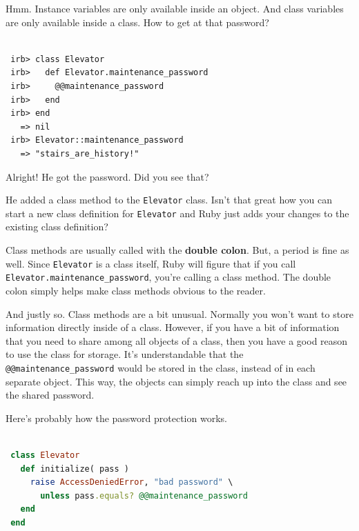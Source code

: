 \documentclass[10pt,twoside]{report}
\begin{document}
Hmm.  Instance variables are only available inside an object.  And
class variables are only available inside a class.  How to get at that
password?


\begin{lstlisting}

 irb> class Elevator
 irb>   def Elevator.maintenance_password
 irb>     @@maintenance_password
 irb>   end
 irb> end
   => nil
 irb> Elevator::maintenance_password
   => "stairs_are_history!"

\end{lstlisting}


Alright!  He got the password.  Did you see that?

He added a class method to the \lstinline[breaklines=true]|Elevator|
class.  Isn't that great how you can start a new class definition for
\lstinline[breaklines=true]|Elevator| and Ruby just adds your changes
to the existing class definition?

Class methods are usually called with the {\bf double colon}.  But, a
period is fine as well. Since \lstinline[breaklines=true]|Elevator| is
a class itself, Ruby will figure that if you call
\lstinline[breaklines=true]|Elevator.maintenance_password|, you're
calling a class method.  The double colon simply helps make class
methods obvious to the reader.

And justly so.  Class methods are a bit unusual.  Normally you won't
want to store information directly inside of a class.  However, if you
have a bit of information that you need to share among all objects of
a class, then you have a good reason to use the class for
storage. It's understandable that the
\lstinline[breaklines=true]|@@maintenance_password| would be stored in
the class, instead of in each separate object.  This way, the objects
can simply reach up into the class and see the shared password.

Here's probably how the password protection works.


\begin{lstlisting}[basicstyle=\ttfamily\color{basiccolor},
    commentstyle = \ttfamily\color{commentcolor},
    keywordstyle=\ttfamily\color{keywordscolor},
    stringstyle=\color{stringcolor},
    language=Ruby,
    basicstyle=\small\ttfamily,
    showstringspaces=false,
  ]

 class Elevator
   def initialize( pass )
     raise AccessDeniedError, "bad password" \
       unless pass.equals? @@maintenance_password
   end
 end

\end{lstlisting}
\end{document}
